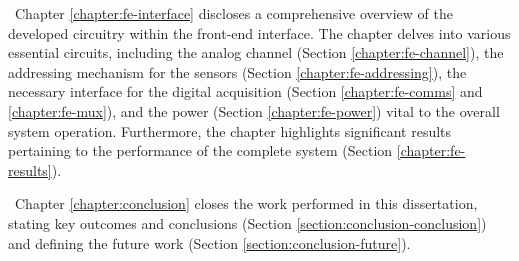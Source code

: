 \noindent
\textbullet \, Chapter \ref{chapter:fe-interface} discloses a comprehensive overview of the developed circuitry within the front-end interface. The chapter delves into various essential circuits, including the analog channel (Section \ref{chapter:fe-channel}), the addressing mechanism for the sensors (Section \ref{chapter:fe-addressing}), the necessary interface for the digital acquisition (Section \ref{chapter:fe-comms} and \ref{chapter:fe-mux}), and the power (Section \ref{chapter:fe-power}) vital to the overall system operation. Furthermore, the chapter highlights significant results pertaining to the performance of the complete system (Section \ref{chapter:fe-results}).

\noindent
\textbullet \, Chapter \ref{chapter:conclusion} closes the work performed in this dissertation, stating key outcomes and conclusions (Section \ref{section:conclusion-conclusion}) and defining the future work (Section \ref{section:conclusion-future}).


\clearpage
\thispagestyle{empty}
\cleardoublepage